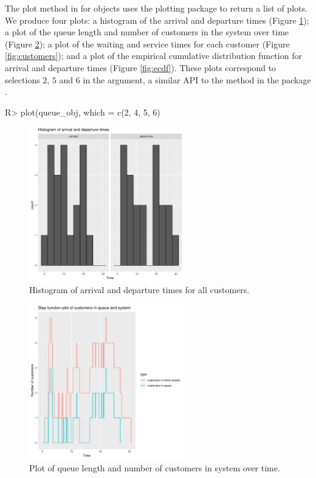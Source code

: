 \documentclass[article]{jss}
\begin{document}
The plot method in  for  objects uses the plotting package  \citep{Rpkg_ggplot2} to return a list of plots. We produce four plots: a histogram of the arrival and departure times (Figure \ref{fig:histogram}); a plot of the queue length and number of customers in the system over time (Figure \ref{fig:qlength}); a plot of the waiting and service times for each customer (Figure \ref{fig:customers}); and a plot of the empirical cumulative distribution function for arrival and departure times (Figure \ref{fig:ecdf}). These plots correspond to selections $2$, $5$ and $6$ in the  argument, a similar API to the  method in the  package \citep{Rproglang}.

\begin{CodeChunk}
\begin{Sinput}
R> plot(queue_obj, which = c(2, 4, 5, 6)
\end{Sinput}
\end{CodeChunk}

\begin{figure}[!htb]
\centering
\includegraphics[width = 0.6\textwidth]{Figures/hist_083.pdf}
\caption{Histogram of arrival and departure times for all customers.}
\label{fig:histogram}
\end{figure}

\begin{figure}[!htb]
\centering
\includegraphics[width = 0.6\textwidth]{Figures/qlength_083.pdf}
\caption{Plot of queue length and number of customers in system over time.}
\label{fig:qlength}
\end{figure}
\end{document}
